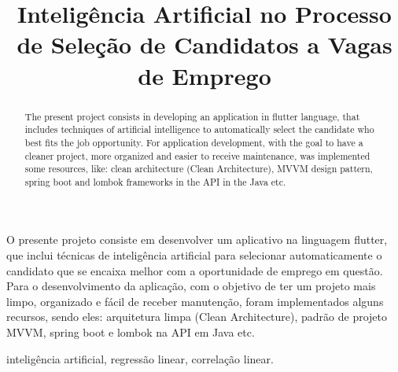 \documentclass[conference]{IEEEtran}
\begin{document}
\title{Inteligência Artificial no Processo de Seleção de Candidatos a Vagas de Emprego\\

}

\author{
\and
{}
\and
{}
}

\maketitle

\begin{resumo}
O presente projeto consiste em desenvolver um aplicativo na linguagem flutter, que inclui técnicas de inteligência artificial para selecionar automaticamente o candidato que se encaixa melhor com a oportunidade de emprego em questão. Para o desenvolvimento da aplicação, com o objetivo de ter um projeto mais limpo, organizado e fácil de receber manutenção, foram implementados alguns recursos, sendo eles: arquitetura limpa (Clean Architecture), padrão de projeto MVVM, spring boot e lombok na API em Java etc.
\end{resumo}

\begin{IEEEpalavrachave}
inteligência artificial, regressão linear, correlação linear.
\end{IEEEpalavrachave}

\begin{abstract}
The present project consists in developing an application in flutter language, that includes techniques of artificial intelligence to automatically select the candidate who best fits the job opportunity. For application development, with the goal to have a cleaner project, more organized and easier to receive maintenance, was implemented some resources, like: clean architecture (Clean Architecture), MVVM design pattern, spring boot and lombok frameworks in the API in the Java etc.
\end{abstract}
\end{document}
